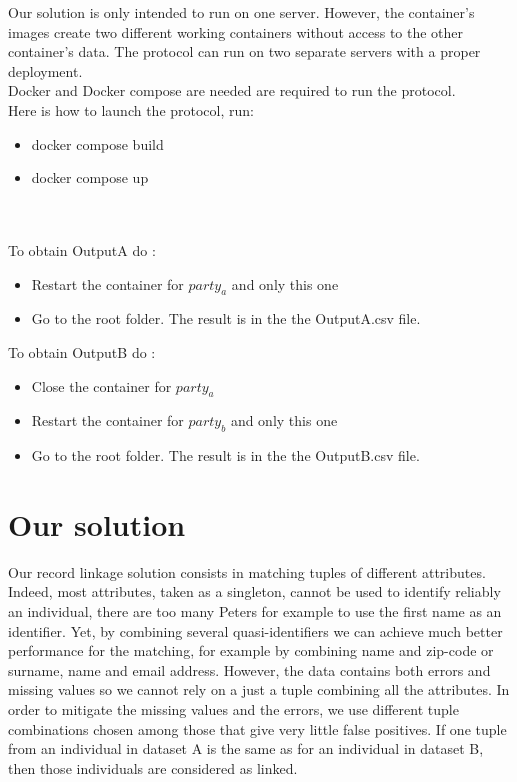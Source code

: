 \documentclass{article}
\begin{document}
Our solution is only intended to run on one server. However, the container's images create two different working containers without access to the other container's data. The protocol can run on two separate servers with a proper deployment.\\


Docker and Docker compose are needed are required to run the protocol.\\

Here is how to launch the protocol, run:
\begin{itemize}
\item docker compose build
\item docker compose up
\end{itemize}
\\\\
To obtain OutputA do :
\begin{itemize}
\item Restart the container for $party_a$ and only this one
\item Go to the root folder. The result is in the the OutputA.csv file.
\end{itemize}

To obtain OutputB do :
\begin{itemize}
\item Close the container for $party_a$
\item Restart the container for $party_b$ and only this one
\item Go to the root folder. The result is in the the OutputB.csv file.
\end{itemize}

\section{Our solution}


Our record linkage solution consists in matching tuples of different attributes. Indeed,
most attributes, taken as a singleton, cannot be used to identify reliably an individual, there are too many Peters for example to use the first name as an identifier. Yet, by combining several quasi-identifiers we can achieve much better performance for the matching, for example by combining name and zip-code or surname, name and email address. However, the data contains both errors and missing values so we cannot rely on a just a tuple combining all the attributes. In order to mitigate the missing values and the errors, we use different tuple combinations chosen among those that give very little false positives. If one tuple from an individual in dataset A is the same as for an individual in dataset B, then those individuals are considered as linked. 
\end{document}
